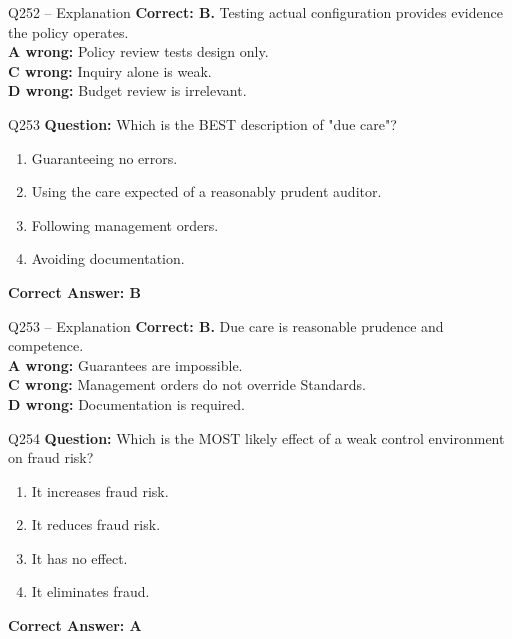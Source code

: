 \documentclass[aspectratio=169,10pt]{beamer}
\begin{document}
	\begin{frame}[t]{Q252 -- Explanation}
		\small
		\textbf{Correct: B.} Testing actual configuration provides evidence the policy operates. \\[4pt]
		\textbf{A wrong:} Policy review tests design only. \\[2pt]
		\textbf{C wrong:} Inquiry alone is weak. \\[2pt]
		\textbf{D wrong:} Budget review is irrelevant.
	\end{frame}
	
	\begin{frame}[t]{Q253}
		\small
		\textbf{Question:} Which is the BEST description of "due care"?
		\begin{enumerate}[label=\Alph*.,itemsep=1pt,topsep=2pt]
			\item Guaranteeing no errors.
			\item Using the care expected of a reasonably prudent auditor.
			\item Following management orders.
			\item Avoiding documentation.
		\end{enumerate}
		\vspace{4pt}
		\textbf{Correct Answer: B}
	\end{frame}
	
	\begin{frame}[t]{Q253 -- Explanation}
		\small
		\textbf{Correct: B.} Due care is reasonable prudence and competence. \\[4pt]
		\textbf{A wrong:} Guarantees are impossible. \\[2pt]
		\textbf{C wrong:} Management orders do not override Standards. \\[2pt]
		\textbf{D wrong:} Documentation is required.
	\end{frame}
	
	\begin{frame}[t]{Q254}
		\small
		\textbf{Question:} Which is the MOST likely effect of a weak control environment on fraud risk?
		\begin{enumerate}[label=\Alph*.,itemsep=1pt,topsep=2pt]
			\item It increases fraud risk.
			\item It reduces fraud risk.
			\item It has no effect.
			\item It eliminates fraud.
		\end{enumerate}
		\vspace{4pt}
		\textbf{Correct Answer: A}
	\end{frame}
	
\end{document}
